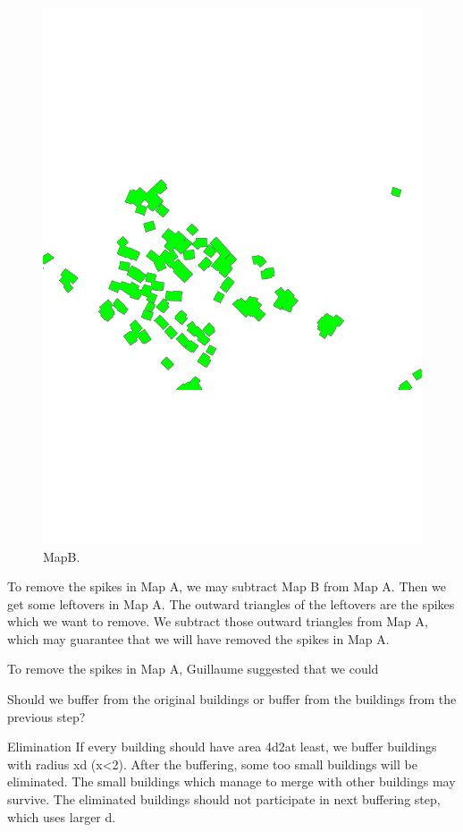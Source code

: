 \documentclass[graybox]{svmult}
\begin{document}
\begin{figure}[tb]
	\centering
	\includegraphics[width=\linewidth]{MapB}
	\caption{MapB.}
	\label{fig:MapB}
\end{figure}

To remove the spikes in Map A, we may subtract Map B from Map A. 
Then we get some leftovers in Map A. The outward triangles of 
the leftovers are the spikes which we want to remove. We 
subtract those outward triangles from Map A, which may guarantee 
that we will have removed the spikes in Map A.

To remove the spikes in Map A, Guillaume suggested that we could 

Should we buffer from the original buildings or buffer from the 
buildings from the previous step?


Elimination
If every building should have area 4d2at least, we buffer 
buildings with radius xd (x<2). After the buffering, some too 
small buildings will be eliminated. The small buildings which 
manage to merge with other buildings may survive. The eliminated 
buildings should not participate in next buffering step, which 
uses larger d.
\end{document}
